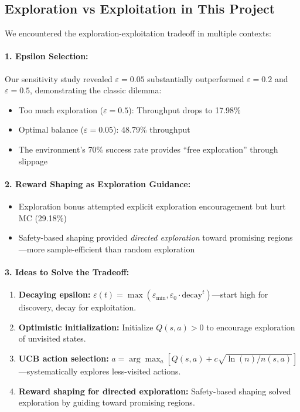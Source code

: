 \documentclass[11pt,a4paper]{article}
\begin{document}
\subsection{Exploration vs Exploitation in This Project}

We encountered the exploration-exploitation tradeoff in multiple contexts:

\paragraph{1. Epsilon Selection:}
Our sensitivity study revealed $\varepsilon=0.05$ substantially outperformed $\varepsilon=0.2$ and $\varepsilon=0.5$, demonstrating the classic dilemma:
\begin{itemize}
    \item Too much exploration ($\varepsilon=0.5$): Throughput drops to 17.98\%
    \item Optimal balance ($\varepsilon=0.05$): 48.79\% throughput
    \item The environment's 70\% success rate provides ``free exploration'' through slippage
\end{itemize}

\paragraph{2. Reward Shaping as Exploration Guidance:}
\begin{itemize}
    \item Exploration bonus attempted explicit exploration encouragement but hurt MC (29.18\%)
    \item Safety-based shaping provided \emph{directed exploration} toward promising regions—more sample-efficient than random exploration
\end{itemize}

\paragraph{3. Ideas to Solve the Tradeoff:}
\begin{enumerate}
    \item \textbf{Decaying epsilon:} $\varepsilon(t) = \max(\varepsilon_{\min}, \varepsilon_0 \cdot \text{decay}^t)$—start high for discovery, decay for exploitation.
    \item \textbf{Optimistic initialization:} Initialize $Q(s,a) > 0$ to encourage exploration of unvisited states.
    \item \textbf{UCB action selection:} $a = \arg\max_a [Q(s,a) + c\sqrt{\ln(n)/n(s,a)}]$—systematically explores less-visited actions.
    \item \textbf{Reward shaping for directed exploration:} Safety-based shaping solved exploration by guiding toward promising regions.
\end{enumerate}
\end{document}
